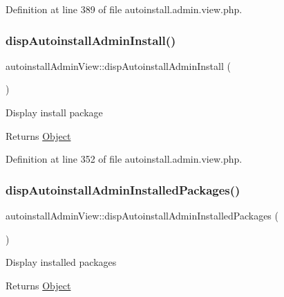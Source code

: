 Definition at line 389 of file autoinstall.\+admin.\+view.\+php.

\mbox{\label{classautoinstallAdminView_a096fdb7d03bea9f0b1a48dd5f471bbd2}} 
\subsubsection{\texorpdfstring{disp\+Autoinstall\+Admin\+Install()}{dispAutoinstallAdminInstall()}}
{\footnotesize\ttfamily autoinstall\+Admin\+View\+::disp\+Autoinstall\+Admin\+Install (\begin{DoxyParamCaption}{ }\end{DoxyParamCaption})}

Display install package

\begin{DoxyReturn}{Returns}
\hyperlink{classObject}{Object} 
\end{DoxyReturn}


Definition at line 352 of file autoinstall.\+admin.\+view.\+php.

\mbox{\label{classautoinstallAdminView_a57de04bc93c4b62ad0c8fff257b4a837}} 
\subsubsection{\texorpdfstring{disp\+Autoinstall\+Admin\+Installed\+Packages()}{dispAutoinstallAdminInstalledPackages()}}
{\footnotesize\ttfamily autoinstall\+Admin\+View\+::disp\+Autoinstall\+Admin\+Installed\+Packages (\begin{DoxyParamCaption}{ }\end{DoxyParamCaption})}

Display installed packages

\begin{DoxyReturn}{Returns}
\hyperlink{classObject}{Object} 
\end{DoxyReturn}


